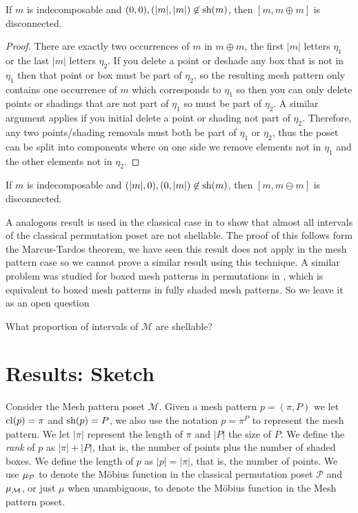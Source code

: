 \documentclass[11pt,a4paper,oneside]{article}
\begin{document}
\begin{lem}
If $m$ is indecomposable and $(0,0),(|m|,|m|)\not\in\operatorname{\textrm{sh}}(m)$, then $[m,m\oplus m]$ is disconnected.
\begin{proof}
There are exactly two occurrences of $m$ in $m\oplus m$, the first $|m|$ letters $\eta_1$ or the last $|m|$ letters $\eta_2$. If you delete a point or deshade any box that is not in $\eta_1$ then that point or box must be part of $\eta_2$, so the resulting mesh pattern only contains one occurrence of $m$ which corresponds to $\eta_1$ so then you can only delete points or shadings that are not part of $\eta_1$ so must be part of $\eta_2$. A similar argument applies if you initial delete a point or shading not part of $\eta_2$. Therefore, any two points/shading removals must both be part of $\eta_1$ or $\eta_2$, thus the poset can be split into components where on one side we remove elements not in $\eta_1$ and the other elements not in $\eta_2$.
\end{proof}
\end{lem}
\begin{cor}
If $m$ is indecomposable and $(|m|,0),(0,|m|)\not\in\operatorname{\textrm{sh}}(m)$, then $[m,m\ominus m]$ is disconnected.
\end{cor}

A analogous result is used in the classical case in \cite{McSt13} to show that almost all intervals of the classical permutation poset are not shellable. The proof of this follows form the Marcus-Tardos theorem, we have seen this result does not apply in the mesh pattern case so we cannot prove a similar result using this technique.  A similar problem was studied for boxed mesh patterns in permutations in \cite{AKV13}, which is equivalent to boxed mesh patterns in fully shaded mesh patterns. So we leave it as an open question
\begin{que}
What proportion of intervals of $\mathcal{M}$ are shellable?
\end{que}

\iffalse

\section{Results: Sketch}
Consider the Mesh pattern poset $\mathcal{M}$. Given a mesh pattern $p=(\pi,P)$ we let $\operatorname{\textrm{cl}}(p)=\pi$ and $\operatorname{\textrm{sh}}(p)=P$, we also use the notation $p=\pi^P$ to represent the mesh pattern. We let $|\pi|$ represent the length of $\pi$ and $|P|$ the size of $P$. We define the \emph{rank} of $p$ as $|\pi|+|P|$, that is, the number of points plus the number of shaded boxes. We define the length of $p$ as $|p|=|\pi|$, that is, the number of points. We use $\operatorname{\mu_\mathcal{P}}$ to denote the M\"obius function in the classical permutation poset $\mathcal{P}$ and $\operatorname{\mu_\mathcal{M}}$, or just $\mu$ when unambiguous, to denote the M\"obius function in the Mesh pattern poset.
\end{document}
